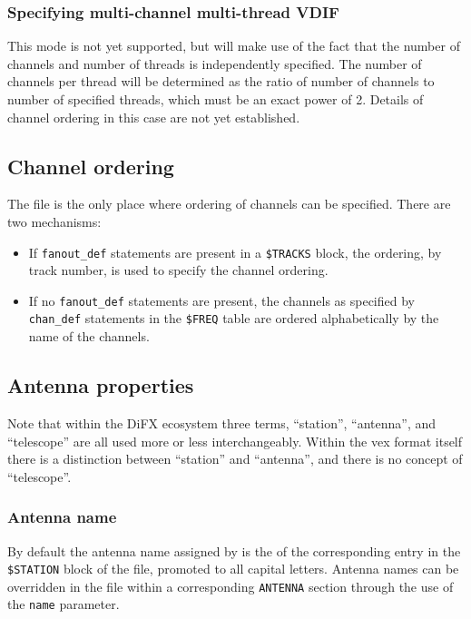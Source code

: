 \documentclass[12pt]{article}
\begin{document}
\subsubsection{Specifying multi-channel multi-thread VDIF}

This mode is not yet supported, but will make use of the fact that the number of channels and number of threads is independently specified.
The number of channels per thread will be determined as the ratio of number of channels to number of specified threads, which must be an exact power of 2.
Details of channel ordering in this case are not yet established.

\subsection{Channel ordering} \label{sec:channels}

The \vx file is the only place where ordering of channels can be specified.
There are two mechanisms:
\begin{itemize}
\item If {\tt fanout\_def} statements are present in a {\tt \$TRACKS} block, the ordering, by track number, is used to specify the channel ordering.
\item If no {\tt fanout\_def} statements are present, the channels as specified by {\tt chan\_def} statements in the {\tt \$FREQ} table are ordered alphabetically by the name of the channels.
\end{itemize}


\subsection{Antenna properties}

Note that within the DiFX ecosystem three terms, ``station'', ``antenna'', and ``telescope'' are all used more or less interchangeably.
Within the vex format itself there is a distinction between ``station'' and ``antenna'', and there is no concept of ``telescope''.

\subsubsection{Antenna name}

By default the antenna name assigned by \vexdifx is the  of the corresponding entry in the {\tt \$STATION} block of the \vx file, promoted to all capital letters.
Antenna names can be overridden in the \vd file within a corresponding {\tt ANTENNA} section through the use of the {\tt name} parameter.
\end{document}
